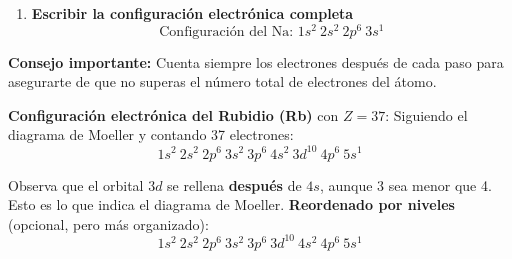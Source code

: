 \begin{enumerate}[label=\textbf{Paso \arabic*:}]
\begin{itemize}
            Electrones colocados: 2 (de \( 1s \)) + 2 (de \( 2s \)) + 6 (de \( 2p \)) + 1 (de \( 3s \)) = 11. ¡Perfecto! Los hemos colocado todos

            Electrones colocados: 10 + 1 = 11.
        \end{itemize}

        \item \textbf{Escribir la configuración electrónica completa}
        \[
            \text{Configuración del Na: } 1s^2\ 2s^2\ 2p^6\ 3s^1
        \]
\end{enumerate}
\begin{remark}
    \textbf{Consejo importante:} Cuenta siempre los electrones después de cada paso para asegurarte de que no superas el número total de electrones del átomo.
\end{remark}
\begin{example}
    \textbf{Configuración electrónica del Rubidio (Rb)} con \( Z = 37 \):
    Siguiendo el diagrama de Moeller y contando 37 electrones:
    \[
        1s^2\ 2s^2\ 2p^6\ 3s^2\ 3p^6\ 4s^2\ 3d^{10}\ 4p^6\ 5s^1
    \]

    Observa que el orbital \( 3d \) se rellena \textbf{después} de \( 4s \), aunque 3 sea menor que 4. Esto es lo que indica el diagrama de Moeller.
    \textbf{Reordenado por niveles} (opcional, pero más organizado):
    \[
        1s^2\ 2s^2\ 2p^6\ 3s^2\ 3p^6\ 3d^{10}\ 4s^2\ 4p^6\ 5s^1
    \]
\end{example}
